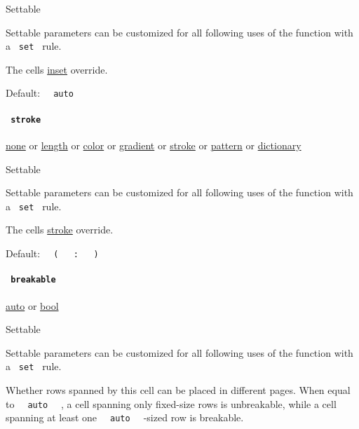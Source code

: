 {{ Settable }}

\label{definitions-cell-inset-settable-tooltip}
Settable parameters can be customized for all following uses of the
function with a \texttt{\ set\ } rule.

The cell\textquotesingle s
\href{/docs/reference/layout/grid/\#parameters-inset}{inset} override.

Default: \texttt{\ }{\texttt{\ auto\ }}\texttt{\ }

\paragraph{\texorpdfstring{\texttt{\ stroke\ }}{ stroke }}\label{definitions-cell-stroke}

\href{/docs/reference/foundations/none/}{none} {or}
\href{/docs/reference/layout/length/}{length} {or}
\href{/docs/reference/visualize/color/}{color} {or}
\href{/docs/reference/visualize/gradient/}{gradient} {or}
\href{/docs/reference/visualize/stroke/}{stroke} {or}
\href{/docs/reference/visualize/pattern/}{pattern} {or}
\href{/docs/reference/foundations/dictionary/}{dictionary}

{{ Settable }}

\label{definitions-cell-stroke-settable-tooltip}
Settable parameters can be customized for all following uses of the
function with a \texttt{\ set\ } rule.

The cell\textquotesingle s
\href{/docs/reference/layout/grid/\#parameters-stroke}{stroke} override.

Default:
\texttt{\ }{\texttt{\ (\ }}\texttt{\ }{\texttt{\ :\ }}\texttt{\ }{\texttt{\ )\ }}\texttt{\ }

\paragraph{\texorpdfstring{\texttt{\ breakable\ }}{ breakable }}\label{definitions-cell-breakable}

\href{/docs/reference/foundations/auto/}{auto} {or}
\href{/docs/reference/foundations/bool/}{bool}

{{ Settable }}

\label{definitions-cell-breakable-settable-tooltip}
Settable parameters can be customized for all following uses of the
function with a \texttt{\ set\ } rule.

Whether rows spanned by this cell can be placed in different pages. When
equal to \texttt{\ }{\texttt{\ auto\ }}\texttt{\ } , a cell spanning
only fixed-size rows is unbreakable, while a cell spanning at least one
\texttt{\ }{\texttt{\ auto\ }}\texttt{\ } -sized row is breakable.

